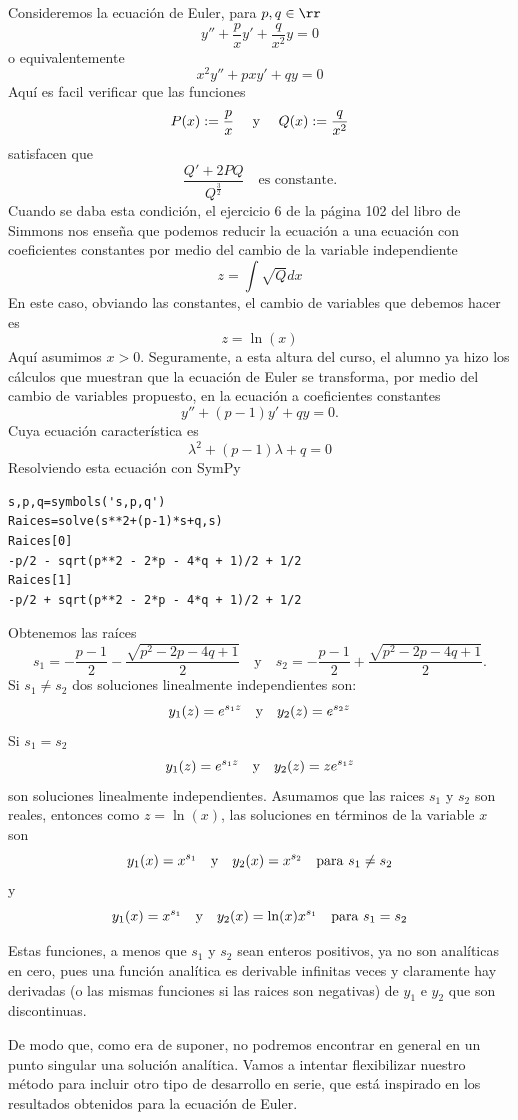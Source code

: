 \begin{ejemplo}{} Consideremos la ecuación de Euler, para $p,q\in\rr$
\[y''+\frac{p}{x}y'+\frac{q}{x^2}y=0\]
o equivalentemente
\[x^2y''+pxy'+qy=0\]
Aquí es facil verificar que las funciones
\[P(x):=\frac{p}{x}\quad\hbox{ y }\quad Q(x):= \frac{q}{x^2}\]
satisfacen que
\[\frac{Q'+2PQ}{Q^{\frac{3}{2}}}\quad\text{es constante.}\]
 Cuando se daba esta condición, el ejercicio 6 de la página 102 del libro de Simmons nos enseña que podemos reducir la ecuación a una ecuación con coeficientes constantes por medio del cambio de la variable independiente
\[z=\int\sqrt{Q}dx\]
En este caso, obviando las constantes, el cambio de variables que debemos hacer es
\[z=\ln(x)\]
Aquí  asumimos $x>0$. Seguramente, a esta altura del curso,  el alumno ya hizo los cálculos que muestran que la ecuación de Euler se transforma,  por medio del cambio de variables propuesto, en la ecuación a coeficientes constantes
\[y''+(p-1)y'+qy=0.\]
Cuya ecuación característica es
\[\lambda^2+(p-1)\lambda+q=0\]
Resolviendo esta ecuación con SymPy

\begin{lstlisting}
s,p,q=symbols('s,p,q')
Raices=solve(s**2+(p-1)*s+q,s)
Raices[0]
-p/2 - sqrt(p**2 - 2*p - 4*q + 1)/2 + 1/2
Raices[1]
-p/2 + sqrt(p**2 - 2*p - 4*q + 1)/2 + 1/2
\end{lstlisting}
Obtenemos las raíces
\[s_1= -\frac{p-1}{2} - \frac{\sqrt{p^2 - 2p - 4q + 1}}{2}   \quad\text{y}\quad s_2=-\frac{p-1}{2} +\frac{\sqrt{p^2 - 2p - 4q + 1}}{2} .\]
 Si $s_1\neq s_2$ dos soluciones linealmente independientes son:
\[y_1(z)=e^{s_1z}\quad\hbox{y}\quad y_2(z)=e^{s_2z}\]
 Si $s_1=s_2$
\[y_1(z)=e^{s_1z} \quad\hbox{y}\quad y_2(z)=ze^{s_1z}\]
son soluciones linealmente independientes. Asumamos que las raices $s_1$ y $s_2$ son reales, entonces como $z=\ln(x)$, las soluciones en términos de la variable $x$ son
\[y_1(x)=x^{s_1}\quad\hbox{y}\quad y_2(x)=x^{s_2}\quad\text{para }  s_1\neq s_2\]
y
\[y_1(x)=x^{s_1} \quad\hbox{y}\quad y_2(x)=\ln(x)x^{s_1}\quad\text{para }  s_1= s_2\]



Estas funciones, a menos que $s_1$ y $s_2$ sean enteros positivos, ya no son analíticas en cero, pues una función analítica es derivable infinitas veces y claramente hay derivadas (o las mismas funciones si las raices son negativas) de $y_1$ e $y_2$ que son discontinuas.
\end{ejemplo}


De modo que, como era de suponer, no podremos encontrar en general en un punto singular una solución analítica.  Vamos a intentar flexibilizar nuestro método para incluir otro tipo de desarrollo en serie, que está inspirado en los resultados obtenidos para la ecuación de Euler.


